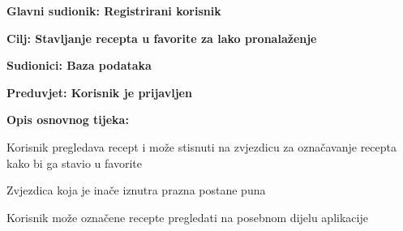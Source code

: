	\noindent {}
	\begin{packed_item}
		
		\item \textbf{Glavni sudionik: Registrirani korisnik}
		\item  \textbf{Cilj: Stavljanje recepta u favorite za lako pronalaženje} 
		\item  \textbf{Sudionici: Baza podataka} 
		\item  \textbf{Preduvjet: Korisnik je prijavljen} 
		\item  \textbf{Opis osnovnog tijeka:}
		
		\item[] \begin{packed_enum}
			
			\item Korisnik pregledava recept i može stisnuti na zvjezdicu za označavanje recepta kako bi ga stavio u favorite
			\item Zvjezdica koja je inače iznutra prazna postane puna
			\item Korisnik može označene recepte pregledati na posebnom dijelu aplikacije
		\end{packed_enum}
		
		
	\end{packed_item}
	
